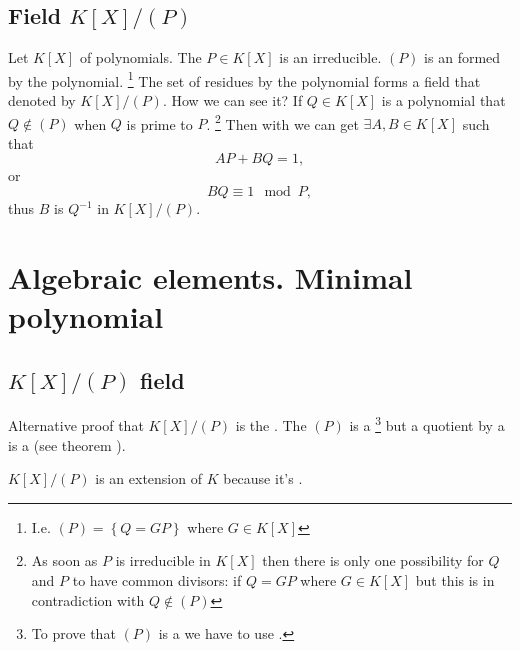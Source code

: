 \subsection{Field $K\left[X\right]/\left(P\right)$}
Let $K\left[X\right]$  of polynomials.
The $P \in K\left[X\right]$ is an irreducible. $\left(P\right)$ is an
 formed by the polynomial.
\footnote{
  I.e.
  \(
  \left(P\right) = \left\{ Q = G P \right\} 
  \)
  where $G \in K\left[X\right]$
}
The set of residues by
the polynomial forms a field that denoted by
$K\left[X\right]/\left(P\right)$. How we can see it?
If $Q \in K\left[X\right]$ is a polynomial that $Q \notin
\left(P\right)$ when $Q$ is prime to $P$.
\footnote{
  As soon as $P$ is irreducible in $K\left[X\right]$ then there is only
  one possibility for $Q$ and $P$ to have common divisors: if $Q = G P$
  where $G \in K\left[X\right]$ but this is in contradiction with
  $Q \notin \left(P\right)$
}
Then with
 we can get $\exists A, B \in K\left[X\right]$
such that
\[
A P + B Q = 1,
\]
or
\[
B Q \equiv 1 \mod P,
\]
thus $B$ is $Q^{-1}$ in $K\left[X\right]/\left(P\right)$.


\section{Algebraic elements. Minimal polynomial}

\subsection{$K\left[X\right]/\left(P\right)$ field}

Alternative proof that $K\left[X\right]/\left(P\right)$ is the
. The $\left(P\right)$ is a 
\footnote{
  To prove that $\left(P\right)$ is a  we have
  to use .
}
but a quotient by a   is a 
(see theorem ).

$K\left[X\right]/\left(P\right)$ is an extension of $K$ because it's
.

